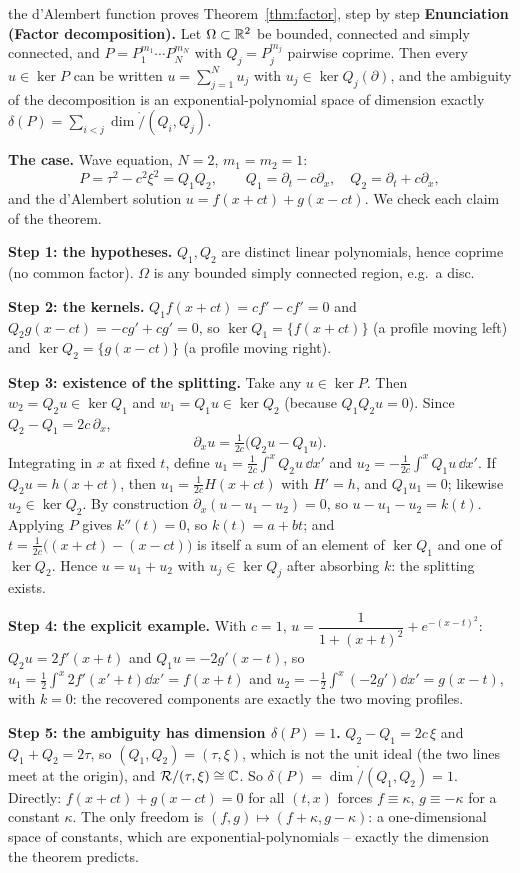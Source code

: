 \begin{explained}{the d'Alembert function proves Theorem~\ref{thm:factor}, step by step}
\textbf{Enunciation (Factor decomposition).} Let $\Omega\subset\mathbb{R}^2$ be bounded, connected and simply connected, and $P=P_1^{m_1}\cdots P_N^{m_N}$ with $Q_j=P_j^{m_j}$ pairwise coprime. Then every $u\in\ker P$ can be written $u=\sum_{j=1}^Nu_j$ with $u_j\in\ker Q_j(\partial)$, and the ambiguity of the decomposition is an exponential-polynomial space of dimension exactly $\delta(P)=\sum_{i<j}\dim\ring/(Q_i,Q_j)$.

\medskip\textbf{The case.} Wave equation, $N=2$, $m_1=m_2=1$:
\[
P=\tau^2-c^2\xi^2=Q_1Q_2,\qquad Q_1=\partial_t-c\partial_x,\quad Q_2=\partial_t+c\partial_x,
\]
and the d'Alembert solution $u=f(x+ct)+g(x-ct)$. We check each claim of the theorem.

\medskip\textbf{Step 1: the hypotheses.} $Q_1,Q_2$ are distinct linear polynomials, hence coprime (no common factor). $\Omega$ is any bounded simply connected region, e.g.\ a disc.

\medskip\textbf{Step 2: the kernels.} $Q_1f(x+ct)=cf'-cf'=0$ and $Q_2g(x-ct)=-cg'+cg'=0$, so $\ker Q_1=\{f(x+ct)\}$ (a profile moving left) and $\ker Q_2=\{g(x-ct)\}$ (a profile moving right).

\medskip\textbf{Step 3: existence of the splitting.} Take any $u\in\ker P$. Then $w_2=Q_2u\in\ker Q_1$ and $w_1=Q_1u\in\ker Q_2$ (because $Q_1Q_2u=0$). Since $Q_2-Q_1=2c\,\partial_x$,
\[
\partial_xu=\tfrac1{2c}\big(Q_2u-Q_1u\big).
\]
Integrating in $x$ at fixed $t$, define $u_1=\tfrac1{2c}\int^xQ_2u\,\dd x'$ and $u_2=-\tfrac1{2c}\int^xQ_1u\,\dd x'$. If $Q_2u=h(x+ct)$, then $u_1=\tfrac1{2c}H(x+ct)$ with $H'=h$, and $Q_1u_1=0$; likewise $u_2\in\ker Q_2$. By construction $\partial_x(u-u_1-u_2)=0$, so $u-u_1-u_2=k(t)$. Applying $P$ gives $k''(t)=0$, so $k(t)=a+bt$; and $t=\tfrac1{2c}\big((x+ct)-(x-ct)\big)$ is itself a sum of an element of $\ker Q_1$ and one of $\ker Q_2$. Hence $u=u_1+u_2$ with $u_j\in\ker Q_j$ after absorbing $k$: the splitting exists.

\medskip\textbf{Step 4: the explicit example.} With $c=1$, $u=\dfrac1{1+(x+t)^2}+e^{-(x-t)^2}$: $Q_2u=2f'(x+t)$ and $Q_1u=-2g'(x-t)$, so $u_1=\tfrac12\int^x2f'(x'+t)\dd x'=f(x+t)$ and $u_2=-\tfrac12\int^x(-2g')\dd x'=g(x-t)$, with $k=0$: the recovered components are exactly the two moving profiles.

\medskip\textbf{Step 5: the ambiguity has dimension $\delta(P)=1$.} $Q_2-Q_1=2c\,\xi$ and $Q_1+Q_2=2\tau$, so $(Q_1,Q_2)=(\tau,\xi)$, which is not the unit ideal (the two lines meet at the origin), and $\mathcal{R}/(\tau,\xi)\cong\mathbb{C}$. So $\delta(P)=\dim\ring/(Q_1,Q_2)=1$. Directly: $f(x+ct)+g(x-ct)=0$ for all $(t,x)$ forces $f\equiv\kappa$, $g\equiv-\kappa$ for a constant $\kappa$. The only freedom is $(f,g)\mapsto(f+\kappa,g-\kappa)$: a one-dimensional space of constants, which are exponential-polynomials -- exactly the dimension the theorem predicts.


\end{explained}
